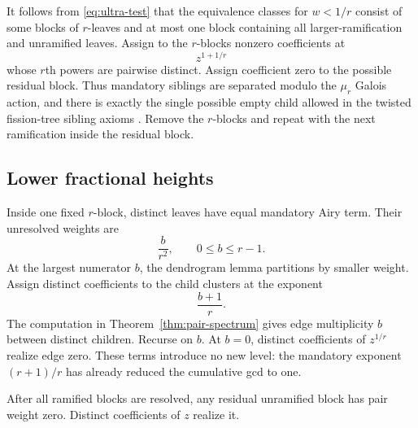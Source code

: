 \documentclass[11pt,a4paper]{amsart}
\theoremstyle{plain}
\theoremstyle{definition}
\begin{document}
It follows from \eqref{eq:ultra-test} that the equivalence classes for $w<1/r$ consist of some
blocks of $r$-leaves and at most one block containing all larger-ramification and unramified leaves.
Assign to the $r$-blocks nonzero coefficients at
\[
 z^{1+1/r}
\]
whose $r$th powers are pairwise distinct.  Assign coefficient zero to the possible residual block.
Thus mandatory siblings are separated modulo the $\mu_r$ Galois action, and there is exactly the
single possible empty child allowed in the twisted fission-tree sibling axioms
\cite[\S3.4]{BoalchDoucotRembado2025}.  Remove the $r$-blocks and repeat with the next ramification
inside the residual block.

\subsection{Lower fractional heights}

Inside one fixed $r$-block, distinct leaves have equal mandatory Airy term.  Their unresolved
weights are
\[
  \frac b{r^2},\qquad 0\le b\le r-1.
\]
At the largest numerator $b$, the dendrogram lemma partitions by smaller weight.  Assign distinct
coefficients to the child clusters at the exponent
\[
  \frac{b+1}{r}.
\]
The computation in Theorem~\ref{thm:pair-spectrum} gives edge multiplicity $b$ between distinct
children.  Recurse on $b$.  At $b=0$, distinct coefficients of $z^{1/r}$ realize edge zero.  These
terms introduce no new level: the mandatory exponent $(r+1)/r$ has already reduced the cumulative
gcd to one.

After all ramified blocks are resolved, any residual unramified block has pair weight zero.
Distinct coefficients of $z$ realize it.
\end{document}
